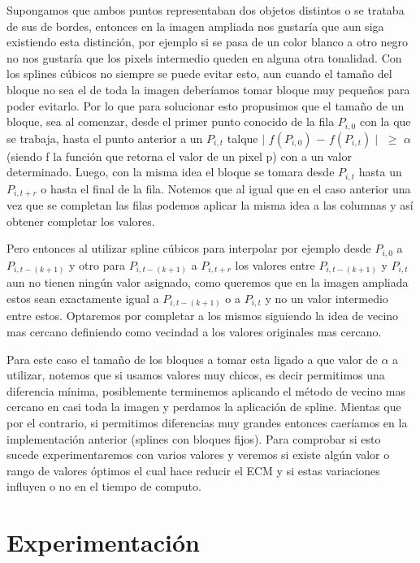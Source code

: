 \documentclass[a4paper]{article}
\newcounter{col}
\begin{document}
Supongamos que ambos puntos representaban dos objetos distintos o se trataba de sus de bordes, entonces en la imagen ampliada nos gustaría que aun siga existiendo esta distinción, por ejemplo si se pasa de un color blanco a otro negro no nos gustaría que los pixels intermedio queden en alguna otra tonalidad. Con los splines cúbicos no siempre se puede evitar esto, aun cuando el tamaño del bloque no sea el de toda la imagen deberíamos tomar bloque muy pequeños para poder evitarlo. Por lo que para solucionar esto propusimos que el tamaño de un bloque, sea al comenzar, desde el primer punto conocido de la fila $P_{i,0}$ con la que se trabaja,  hasta el punto anterior a un $P_{i, t}$ talque  $\mid $  $f(P_{i,0})$  $- $ $f(P_{i, t}) \mid$ $\geq$ $\alpha$ (siendo f la función que retorna el valor de un pixel p) con a un valor determinado. Luego, con la misma idea el bloque se tomara desde $P_{i, t}$ hasta un $P_{i, t+r}$ o hasta el final de la fila. Notemos que al igual que en el caso anterior una vez que se completan las filas podemos aplicar la misma idea a las columnas y así obtener completar los valores. 

Pero entonces al utilizar spline cúbicos para interpolar por ejemplo desde $P_{i,0}$ a $P_{i, t - (k+1)}$ y otro para $P_{i, t - (k+1)}$ a $P_{i, t+r}$ los valores entre $P_{i, t - (k+1)}$ y $P_{i, t}$ aun no tienen ningún valor asignado, como queremos que en la imagen ampliada estos sean exactamente igual a $P_{i, t - (k+1)}$ o a $P_{i, t}$ y no un valor intermedio entre estos. Optaremos por completar a los mismos siguiendo la idea de vecino mas cercano definiendo como vecindad a los valores originales mas cercano.

Para este caso el tamaño de los bloques a tomar esta ligado a que valor de $\alpha$ a utilizar, notemos que si usamos valores muy chicos, es decir permitimos una diferencia mínima, posiblemente terminemos aplicando el método de vecino mas cercano en casi toda la imagen y perdamos la aplicación de spline. Mientas que por el contrario, si permitimos diferencias muy grandes entonces caeríamos en la implementación anterior (splines con bloques fijos). Para comprobar si esto sucede experimentaremos con varios valores y veremos si existe algún valor o rango de valores óptimos el cual hace reducir el ECM y si estas variaciones influyen o no en el tiempo de computo.



\section{Experimentación}
\end{document}
